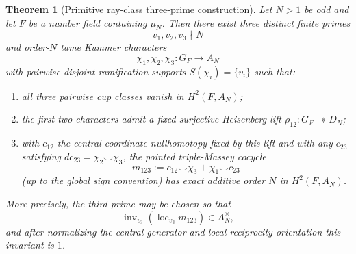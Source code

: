 \documentclass[11pt]{article}
\newtheorem{theorem}{Theorem}[section]
\theoremstyle{remark}
\providecommand{\loc}{\operatorname{loc}}
\providecommand{\inv}{\operatorname{inv}}
\begin{document}
\begin{theorem}[Primitive ray-class three-prime construction]\label{P1L-thm:ray-class-primitive}
Let $N>1$ be odd and let $F$ be a number field containing $\mu_N$.  Then there exist three distinct finite primes
\[
 v_1,v_2,v_3\nmid N
\]
and order-$N$ tame Kummer characters
\[
 \chi_1,\chi_2,\chi_3:G_F\longrightarrow A_N
\]
with pairwise disjoint ramification supports $S(\chi_i)=\{v_i\}$ such that:
\begin{enumerate}
\item all three pairwise cup classes vanish in $H^2(F,A_N)$;
\item the first two characters admit a fixed surjective Heisenberg lift $\rho_{12}:G_F\twoheadrightarrow D_N$;
\item with $c_{12}$ the central-coordinate nullhomotopy fixed by this lift and with any $c_{23}$ satisfying $dc_{23}=\chi_2\smile\chi_3$, the pointed triple-Massey cocycle
\[
 m_{123}:=c_{12}\smile\chi_3+\chi_1\smile c_{23}
\]
(up to the global sign convention) has exact additive order $N$ in $H^2(F,A_N)$.
\end{enumerate}
More precisely, the third prime may be chosen so that
\[
 \inv_{v_3}(\loc_{v_3}m_{123})\in A_N^\times,
\]
and after normalizing the central generator and local reciprocity orientation this invariant is $1$.
\end{theorem}
\end{document}
